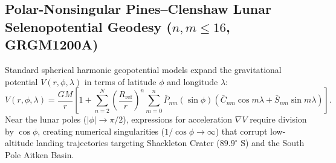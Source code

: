\documentclass[11pt,a4paper,reqno]{article}
\theoremstyle{plain}
\theoremstyle{definition}
\theoremstyle{remark}
\numberwithin{equation}{section}
\numberwithin{table}{section}
\begin{document}
\subsection{Polar-Nonsingular Pines--Clenshaw Lunar Selenopotential Geodesy \texorpdfstring{($n,m \le 16$, GRGM1200A)}{(n,m <= 16, GRGM1200A)}}
\label{sec:pines_clenshaw_geodesy}
Standard spherical harmonic geopotential models expand the gravitational potential $V(r, \phi, \lambda)$ in terms of latitude $\phi$ and longitude $\lambda$:
\begin{equation}
  V(r, \phi, \lambda) = \frac{GM}{r} \left[ 1 + \sum_{n=2}^{N} \left(\frac{R_{\mathrm{ref}}}{r}\right)^n \sum_{m=0}^n \bar{P}_{nm}(\sin\phi) \left( \bar{C}_{nm}\cos m\lambda + \bar{S}_{nm}\sin m\lambda \right) \right].
\end{equation}
Near the lunar poles ($|\phi| \to \pi/2$), expressions for acceleration $\nabla V$ require division by $\cos\phi$, creating numerical singularities ($1/\cos\phi \to \infty$) that corrupt low-altitude landing trajectories targeting Shackleton Crater ($89.9^\circ\text{ S}$) and the South Pole Aitken Basin.
\end{document}
